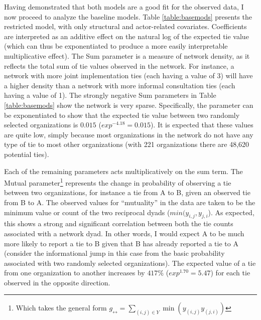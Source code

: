 \documentclass[12pt,a4paper,titlepage]{article}
\begin{document}
Having demonstrated that both models are a good fit for the observed data, I now proceed to analyze the baseline models. Table \ref{table:basemods} presents the restricted model, with only structural and actor-related covariates. Coefficients are interpreted as an additive effect on the natural log of the expected tie value (which can thus be exponentiated to produce a more easily interpretable multiplicative effect). The Sum parameter is a measure of network density, as it reflects the total sum of tie values observed in the network. For instance, a network with more joint implementation ties (each having a value of 3) will have a higher density than a network with more informal consultation ties (each having a value of 1). The strongly negative Sum parameters in Table \ref{table:basemods} show the network is very sparse. Specifically, the parameter can be exponentiated to show that the expected tie value between two randomly selected organizations is $0.015$ ($exp^{-4.18} = 0.015$). It is expected that these values are quite low, simply because most organizations in the network do not have any type of tie to most other organizations (with 221 organizations there are 48,620 potential ties).



Each of the remaining parameters acts multiplicatively on the sum term. The Mutual parameter\footnote{Which takes the general form $g_{\leftrightarrow} = \sum_{(i,j) \in Y} \min{( y_{(i,j)} y_{(j,i)})}$} represents the change in probability of observing a tie between two organizations, for instance a tie from A to B, given an observed tie from B to A. The observed values for “mutuality” in the data are taken to be the minimum value or count of the two reciprocal dyads ($min(y_{i,j},y_{j,i}$). As expected, this shows a strong and significant correlation between both the tie counts associated with a network dyad. In other words, I would expect A to be much more likely to report a tie to B given that B has already reported a tie to A (consider the informational jump in this case from the basic probability associated with two randomly selected organizations). The expected value of a tie from one organization to another increases by $417\%$ ($exp^{1.70} = 5.47$) for each tie observed in the opposite direction.
\end{document}
